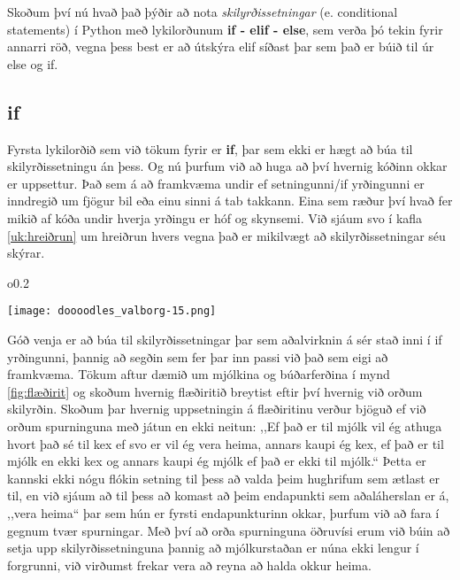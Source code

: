 Skoðum því nú hvað það þýðir að nota \textit{skilyrðissetningar} (e. conditional statements) í Python með lykilorðunum \textbf{if - elif - else}, sem verða þó tekin fyrir annarri röð, vegna þess best er að útskýra elif síðast þar sem það er búið til úr else og if.

\subsection{if}
Fyrsta lykilorðið sem við tökum fyrir er \textbf{if}, þar sem ekki er hægt að búa til skilyrðissetningu án þess.
Og nú þurfum við að huga að því hvernig kóðinn okkar er uppsettur.
Það sem á að framkvæma undir ef setningunni/if yrðingunni er inndregið um fjögur bil eða einu sinni á tab takkann.
Eina sem ræður því hvað fer mikið af kóða undir hverja yrðingu er hóf og skynsemi.
Við sjáum svo í kafla \ref{uk:hreiðrun} um hreiðrun hvers vegna það er mikilvægt að skilyrðissetningar séu skýrar.
\begin{wrapfigure}{o}{0.2\textwidth} %
	\begin{center}
		\texttt{[image: doooodles\_valborg-15.png]}
	\end{center}
\end{wrapfigure}
Góð venja er að búa til skilyrðissetningar þar sem aðalvirknin á sér stað inni í if yrðingunni, þannig að segðin sem fer þar inn passi við það sem eigi að framkvæma.
Tökum aftur dæmið um mjólkina og búðarferðina í mynd \ref{fig:flæðirit} og skoðum hvernig flæðiritið breytist eftir því hvernig við orðum skilyrðin.
Skoðum þar hvernig uppsetningin á flæðiritinu verður bjöguð ef við orðum spurninguna með játun en ekki neitun: ,,Ef það er til mjólk vil ég athuga hvort það sé til kex ef svo er vil ég vera heima, annars kaupi ég kex, ef það er til mjólk en ekki kex og annars kaupi ég mjólk ef það er ekki til mjólk.“
Þetta er kannski ekki nógu flókin setning til þess að valda þeim hughrifum sem ætlast er til, en við sjáum að til þess að komast að þeim endapunkti sem aðaláherslan er á, ,,vera heima“ þar sem hún er fyrsti endapunkturinn okkar, þurfum við að fara í gegnum tvær spurningar.
Með því að orða spurninguna öðruvísi erum við búin að setja upp skilyrðissetninguna þannig að mjólkurstaðan er núna ekki lengur í forgrunni, við virðumst frekar vera að reyna að halda okkur heima.


